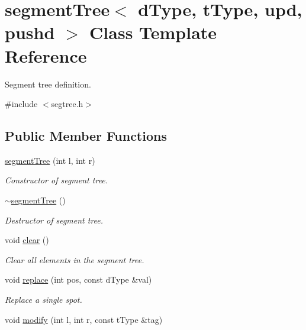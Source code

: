 \hypertarget{classsegment_tree}{}\section{segment\+Tree$<$ d\+Type, t\+Type, upd, pushd $>$ Class Template Reference}
\label{classsegment_tree}


Segment tree definition.  




{\ttfamily \#include $<$segtree.\+h$>$}

\subsection*{Public Member Functions}
\begin{DoxyCompactItemize}
\item 
\mbox{\hyperlink{classsegment_tree_ab4520ca7991d68d7c2507c54b030b0f9}{segment\+Tree}} (int l, int r)
\begin{DoxyCompactList}\small\item\em Constructor of segment tree. \end{DoxyCompactList}\item 
\mbox{\label{classsegment_tree_a9e872bdd920fb80c2444f3bf84419947}} 
\mbox{\hyperlink{classsegment_tree_a9e872bdd920fb80c2444f3bf84419947}{$\sim$segment\+Tree}} ()
\begin{DoxyCompactList}\small\item\em Destructor of segment tree. \end{DoxyCompactList}\item 
void \mbox{\hyperlink{classsegment_tree_a39aaff1b005ca0487cda0943ed295536}{clear}} ()
\begin{DoxyCompactList}\small\item\em Clear all elements in the segment tree. \end{DoxyCompactList}\item 
void \mbox{\hyperlink{classsegment_tree_a4b043b0364ab05a79dcb716bc6fce205}{replace}} (int pos, const d\+Type \&val)
\begin{DoxyCompactList}\small\item\em Replace a single spot. \end{DoxyCompactList}\item 
void \mbox{\hyperlink{classsegment_tree_a087d22f6a87884aa2d73c10f1de4bca3}{modify}} (int l, int r, const t\+Type \&tag)

\end{DoxyCompactItemize}
